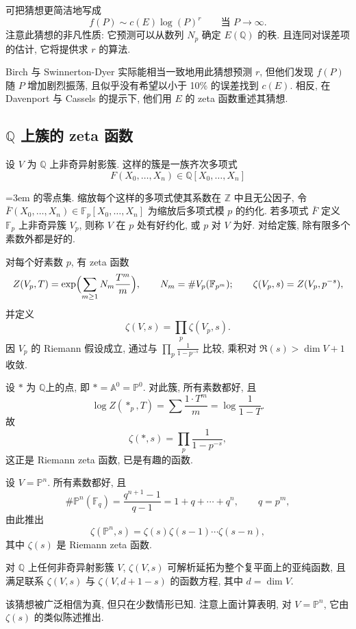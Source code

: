 可把猜想更简洁地写成
\[
f(P)\sim c(E)\log(P)^r \qquad \text{当 } P\to\infty.
\]
注意此猜想的非凡性质: 它预测可以从数列 $N_p$ 确定 $E(\mathbb{Q})$ 的秩. 且连同对误差项的估计, 它将提供求 $r$ 的算法.

Birch 与 Swinnerton-Dyer 实际能相当一致地用此猜想预测 $r$, 但他们发现 $f(P)$ 随 $P$ 增加剧烈振荡, 且似乎没有希望以小于 10\% 的误差找到 $c(E)$. 相反, 在 Davenport 与 Cassels 的提示下, 他们用 $E$ 的 zeta 函数重述其猜想.

\subsection*{$\mathbb{Q}$ 上簇的 zeta 函数}

设 $V$ 为 $\mathbb{Q}$ 上非奇异射影簇. 这样的簇是一族齐次多项式
\[
F(X_0, \dots, X_n)\in\mathbb{Q}[X_0, \dots, X_n]
\]
{\emergencystretch=3em 的零点集. 缩放每个这样的多项式使其系数在 $\mathbb{Z}$ 中且无公因子, 令 $\bar{F}(X_0, \dots, X_n)\in\mathbb{F}_p[X_0, \dots, X_n]$ 为缩放后多项式模 $p$ 的约化. 若多项式 $\bar{F}$ 定义 $\mathbb{F}_p$ 上非奇异簇 $V_p$, 则称 $V$ 在 $p$ 处有好约化, 或 $p$ 对 $V$ 为好. 对给定簇, 除有限多个素数外都是好的.\par}

对每个好素数 $p$, 有 zeta 函数
\[
Z(V_p, T) = \exp\Bigl(\sum_{m\ge 1}N_m\frac{T^m}{m}\Bigr), \qquad N_m = \#V_p(\mathbb{F}_{p^m}); \qquad
\zeta(V_p, s) = Z(V_p, p^{-s}),
\]
并定义
\[
\zeta(V, s) = \prod_p\zeta(V_p, s).
\]
因 $V_p$ 的 Riemann 假设成立, 通过与 $\prod_p\frac{1}{1-p^{-s}}$ 比较, 乘积对 $\Re(s) > \dim V + 1$ 收敛.

设 $\ast$ 为 $\mathbb{Q}$上的点, 即 $\ast = \mathbb{A}^0 = \mathbb{P}^0$. 对此簇, 所有素数都好, 且
\[
\log Z(\ast_p, T) = \sum\frac{1\cdot T^m}{m} = \log\frac{1}{1-T}.
\]
故
\[
\zeta(\ast, s) = \prod_p\frac{1}{1-p^{-s}},
\]
这正是 Riemann zeta 函数, 已是有趣的函数.

设 $V = \mathbb{P}^n$. 所有素数都好, 且
\[
\#\mathbb{P}^n(\mathbb{F}_q) = \frac{q^{n+1}-1}{q-1} = 1 + q + \cdots + q^n, \qquad q = p^m,
\]
由此推出
\[
\zeta(\mathbb{P}^n, s) = \zeta(s)\zeta(s-1)\cdots\zeta(s-n),
\]
其中 $\zeta(s)$ 是 Riemann zeta 函数.

\begin{conjecture} \label{thm:4.10.2} 
对 $\mathbb{Q}$ 上任何非奇异射影簇 $V$, $\zeta(V, s)$ 可解析延拓为整个复平面上的亚纯函数, 且满足联系 $\zeta(V, s)$ 与 $\zeta(V, d+1-s)$ 的函数方程, 其中 $d = \dim V$.
\end{conjecture}

该猜想被广泛相信为真, 但只在少数情形已知. 注意上面计算表明, 对 $V = \mathbb{P}^n$, 它由 $\zeta(s)$ 的类似陈述推出.

